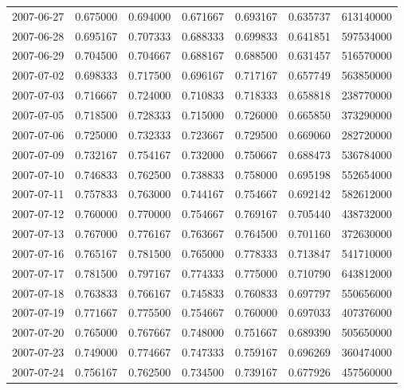 \begin{tabular}{lrrrrrr}
2007-06-27 &    0.675000 &    0.694000 &    0.671667 &    0.693167 &    0.635737 &   613140000 \\
2007-06-28 &    0.695167 &    0.707333 &    0.688333 &    0.699833 &    0.641851 &   597534000 \\
2007-06-29 &    0.704500 &    0.704667 &    0.688167 &    0.688500 &    0.631457 &   516570000 \\
2007-07-02 &    0.698333 &    0.717500 &    0.696167 &    0.717167 &    0.657749 &   563850000 \\
2007-07-03 &    0.716667 &    0.724000 &    0.710833 &    0.718333 &    0.658818 &   238770000 \\
2007-07-05 &    0.718500 &    0.728333 &    0.715000 &    0.726000 &    0.665850 &   373290000 \\
2007-07-06 &    0.725000 &    0.732333 &    0.723667 &    0.729500 &    0.669060 &   282720000 \\
2007-07-09 &    0.732167 &    0.754167 &    0.732000 &    0.750667 &    0.688473 &   536784000 \\
2007-07-10 &    0.746833 &    0.762500 &    0.738833 &    0.758000 &    0.695198 &   552654000 \\
2007-07-11 &    0.757833 &    0.763000 &    0.744167 &    0.754667 &    0.692142 &   582612000 \\
2007-07-12 &    0.760000 &    0.770000 &    0.754667 &    0.769167 &    0.705440 &   438732000 \\
2007-07-13 &    0.767000 &    0.776167 &    0.763667 &    0.764500 &    0.701160 &   372630000 \\
2007-07-16 &    0.765167 &    0.781500 &    0.765000 &    0.778333 &    0.713847 &   541710000 \\
2007-07-17 &    0.781500 &    0.797167 &    0.774333 &    0.775000 &    0.710790 &   643812000 \\
2007-07-18 &    0.763833 &    0.766167 &    0.745833 &    0.760833 &    0.697797 &   550656000 \\
2007-07-19 &    0.771667 &    0.775500 &    0.754667 &    0.760000 &    0.697033 &   407376000 \\
2007-07-20 &    0.765000 &    0.767667 &    0.748000 &    0.751667 &    0.689390 &   505650000 \\
2007-07-23 &    0.749000 &    0.774667 &    0.747333 &    0.759167 &    0.696269 &   360474000 \\
2007-07-24 &    0.756167 &    0.762500 &    0.734500 &    0.739167 &    0.677926 &   457560000 \\

\end{tabular}
